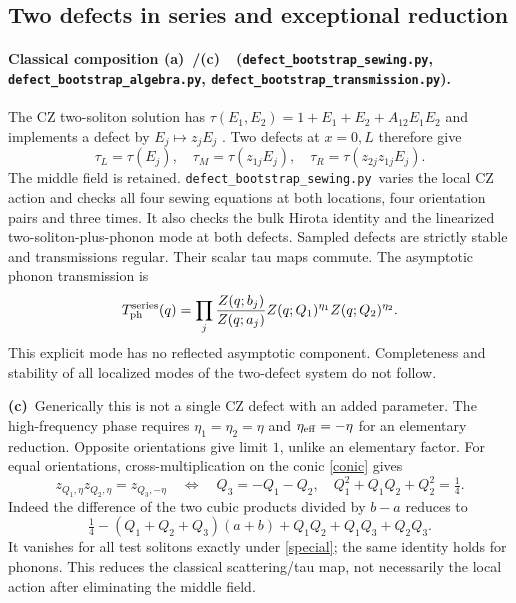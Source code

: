 \documentclass[11pt,a4paper]{article}
\newcommand{\C}{\textbf{(c)}\ }
\newcommand{\A}{\textbf{(a)}\ }
\newcommand{\file}[1]{\nolinkurl{#1}}
\newcommand{\alg}{\file{defect_bootstrap_algebra.py}}
\newcommand{\tra}{\file{defect_bootstrap_transmission.py}}
\newcommand{\sew}{\file{defect_bootstrap_sewing.py}}
\begin{document}
\subsection{Two defects in series and exceptional reduction}
\paragraph{Classical composition \A/\C\ (\sew, \alg, \tra).}
The CZ two-soliton solution has $\tau(E_1,E_2)=1+E_1+E_2+A_{12}E_1E_2$
and implements a defect by $E_j\mapsto z_jE_j$ \cite[Sec.~5.2]{CZ}.
Two defects at $x=0,L$ therefore give
\begin{equation}
 \tau_L=\tau(E_j),\quad \tau_M=\tau(z_{1j}E_j),\quad
 \tau_R=\tau(z_{2j}z_{1j}E_j).\label{series}
\end{equation}
The middle field is retained. \sew\ varies the local CZ action and checks
all four sewing equations at both locations, four orientation pairs and three
times. It also checks the bulk Hirota identity and the linearized
two-soliton-plus-phonon mode at both defects. Sampled defects are strictly
stable and transmissions regular. Their scalar tau maps commute. The
asymptotic phonon transmission is
\begin{equation}
 T_{\rm ph}^{\rm series}(q)=\prod_j\frac{Z(q;b_j)}{Z(q;a_j)}
                   Z(q;Q_1)^{\eta_1}Z(q;Q_2)^{\eta_2}.\label{phseries}
\end{equation}
This explicit mode has no reflected asymptotic component. Completeness and
stability of all localized modes of the two-defect system do not follow.

\C Generically this is not a single CZ defect with an added parameter.
The high-frequency phase requires $\eta_1=\eta_2=\eta$ and
$\eta_{\rm eff}=-\eta$ for an elementary reduction. Opposite orientations
give limit $1$, unlike an elementary factor. For equal orientations,
cross-multiplication on the conic \eqref{conic} gives
\begin{equation}
 z_{Q_1,\eta}z_{Q_2,\eta}=z_{Q_3,-\eta}
 \quad\Longleftrightarrow\quad Q_3=-Q_1-Q_2,\quad
 Q_1^2+Q_1Q_2+Q_2^2=\tfrac14.\label{special}
\end{equation}
Indeed the difference of the two cubic products divided by $b-a$ reduces to
\begin{equation}
 \tfrac14-(Q_1+Q_2+Q_3)(a+b)+Q_1Q_2+Q_1Q_3+Q_2Q_3.\label{poly}
\end{equation}
It vanishes for all test solitons exactly under \eqref{special}; the same
identity holds for phonons. This reduces the classical scattering/tau map,
not necessarily the local action after eliminating the middle field.
\end{document}
